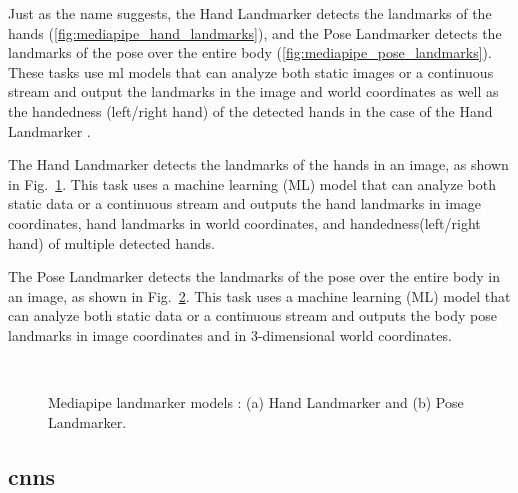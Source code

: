 
Just as the name suggests, the Hand Landmarker detects the landmarks of the hands (\autoref{fig:mediapipe_hand_landmarks}), and the Pose Landmarker detects the landmarks of the pose over the entire body (\autoref{fig:mediapipe_pose_landmarks}). These tasks use \acs{ml} models that can analyze both static images or a continuous stream and output the landmarks in the image and world coordinates as well as the handedness (left/right hand) of the detected hands in the case of the Hand Landmarker \cite{mediapipe_docs}.

The Hand Landmarker detects the landmarks of the hands in an image, as shown in Fig.~\ref{fig:mediapipe_hand_landmarks}. This task uses a machine learning (ML) model that can analyze both static data or a continuous stream and outputs the hand landmarks in image coordinates, hand landmarks in world coordinates, and handedness(left/right hand) of multiple detected hands.

The Pose Landmarker detects the landmarks of the pose over the entire body in an image, as shown in Fig.~\ref{fig:mediapipe_pose_landmarks}.  This task uses a machine learning (ML) model that can analyze both static data or a continuous stream and outputs the body pose landmarks in image coordinates and in 3-dimensional world coordinates.
\fi

\begin{figure}[ht]
    \centering
    \begin{subfigure}[b]{0.49\textwidth}
        \caption{}
        \label{fig:mediapipe_hand_landmarks}
    \end{subfigure} \
    \begin{subfigure}[b]{0.49\textwidth}
        \caption{}
        \label{fig:mediapipe_pose_landmarks}
    \end{subfigure}
    \caption[Mediapipe landmarker models: Hand Landmarker and Pose Landmarker.]{Mediapipe landmarker models \cite{mediapipe_docs}: (a) Hand Landmarker and (b) Pose Landmarker.}
    \label{fig:mediapipe_landmarks}
\end{figure}

\subsection{\acfp{cnn}}

